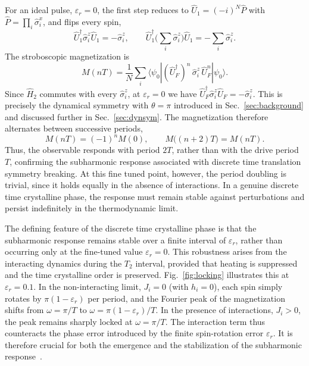 \documentclass[%
reprint,
superscriptaddress,
amsmath,amssymb,
aps,
prb,
showkeys,%
floatfix,
]{revtex4-2}
\let\cite\citep   %
\begin{document}
	For an ideal pulse, $\varepsilon_r=0$, the first step reduces to $\hat{U}_1=(-i)^N\hat{P}$ with $\hat{P}=\prod_i\hat{\sigma}_i^x$, and flips every spin,
	\begin{equation}
		\hat{U}_1^\dagger\hat{\sigma}_i^z\hat{U}_1=-\hat{\sigma}_i^z,
		\qquad
		\hat{U}_1^\dagger\Big(\sum_i\hat{\sigma}_i^z\Big)\hat{U}_1=-\sum_i\hat{\sigma}_i^z .
	\end{equation}
	The stroboscopic magnetization is
	\begin{equation}
		M(nT)=\frac{1}{N}\sum_i\langle\psi_0|(\hat{U}_F^\dagger)^n\,\hat{\sigma}_i^z\,\hat{U}_F^n|\psi_0\rangle .
		\label{eq:magnetization}
	\end{equation}
	Since $\hat{H}_2$ commutes with every $\hat{\sigma}_i^z$, at $\varepsilon_r=0$ we have $\hat{U}_F^\dagger\hat{\sigma}_i^z\hat{U}_F=-\hat{\sigma}_i^z$. This is precisely the dynamical symmetry with $\theta=\pi$ introduced in Sec.~\ref{sec:background} and discussed further in Sec.~\ref{sec:dynsym}. The magnetization therefore alternates between successive periods,
	\begin{equation}
		M(nT)=(-1)^nM(0),
		\qquad
		M\big((n+2)T\big)=M(nT).
	\end{equation}
	Thus, the observable responds with period $2T$, rather than with the drive period $T$, confirming the subharmonic response associated with discrete time translation symmetry breaking. At this fine tuned point, however, the period doubling is trivial, since it holds equally in the absence of interactions. In a genuine discrete time crystalline phase, the response must remain stable against perturbations and persist indefinitely in the thermodynamic limit.
	
	The defining feature of the discrete time crystalline phase is that the subharmonic response remains stable over a finite interval of $\varepsilon_r$, rather than occurring only at the fine-tuned value $\varepsilon_r=0$. This robustness arises from the interacting dynamics during the $T_2$ interval, provided that heating is suppressed and the time crystalline order is preserved. Fig.~\ref{fig:locking} illustrates this at $\varepsilon_r=0.1$. In the non-interacting limit, $J_i=0$ (with $h_i=0$), each spin simply rotates by $\pi(1-\varepsilon_r)$ per period, and the Fourier peak of the magnetization shifts from $\omega=\pi/T$ to $\omega=\pi(1-\varepsilon_r)/T$. In the presence of interactions, $J_i>0$, the peak remains sharply locked at $\omega=\pi/T$. The interaction term thus counteracts the phase error introduced by the finite spin-rotation error $\varepsilon_r$. It is therefore crucial for both the emergence and the stabilization of the subharmonic response~\cite{KhemaniPRL2016,ElseBauerNayak2016,YaoPRL2017}.
	
\end{document}
